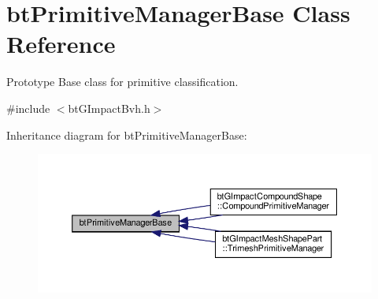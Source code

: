 \hypertarget{classbtPrimitiveManagerBase}{}\section{bt\+Primitive\+Manager\+Base Class Reference}
\label{classbtPrimitiveManagerBase}


Prototype Base class for primitive classification.  




{\ttfamily \#include $<$bt\+G\+Impact\+Bvh.\+h$>$}



Inheritance diagram for bt\+Primitive\+Manager\+Base\+:
\nopagebreak
\begin{figure}[H]
\begin{center}
\leavevmode
\includegraphics[width=350pt]{classbtPrimitiveManagerBase__inherit__graph}
\end{center}
\end{figure}
